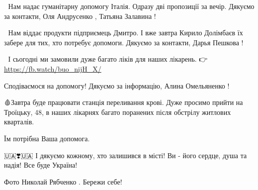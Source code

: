🙂 Нам надає гуманітарну допомогу Італія. Одразу дві пропозиції за вечір.
Дякуємо за контакти, Оля Андрусенко , Татьяна Залавина !

🙂 Нам віддає продукти підприємець Дмитро. І вже завтра Кирило Долімбаєв їх
забере для тих, хто потребує допомоги. Дякуємо за контакти, Дарья Пешкова ! 

🙂 І сьогодні ми замовили дуже багато ліків для наших лікарень. 👉
\url{https://fb.watch/buo_nijH_X/}

Сподіваємося на допомогу! Дякуємо за інформацію, Алина Омельяненко !  

🩸Завтра буде працювати станція переливання крові. Дуже просимо прийти на
Троїцьку, 48, в наших лікарнях багато поранених після обстрілу житлових
кварталів.

Їм потрібна Ваша допомога.

🇺🇦❣️🇺🇦 І дякуємо кожному, хто залишився в місті! Ви - його сердце, душа та
надія! Все буде Україна! 

Фото Николай Рябченко . Бережи себе! 

